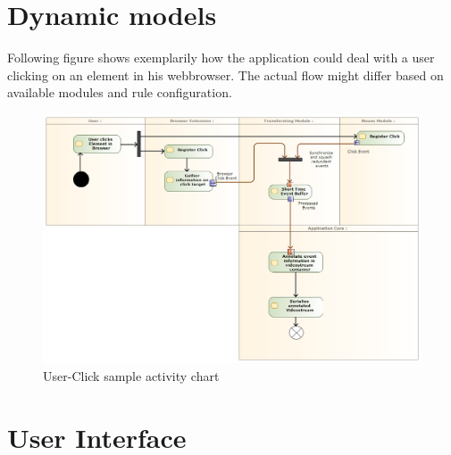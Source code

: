 \section{Dynamic models}
Following figure shows exemplarily how the application could deal with a user clicking on an element in his webbrowser. The actual flow might differ based on available modules and rule configuration.
\begin{figure}[h!]
  \includegraphics[width=1.00\textwidth]{resources/clickactivity.png}
  \centering
  \caption{User-Click sample activity chart}
  \label{fig:clickactivity}
\end{figure}
\section{User Interface}
